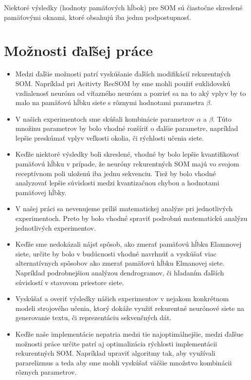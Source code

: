 Niektoré výsledky (hodnoty pamäťových hĺbok) pre SOM sú čiastočne skreslené
pamäťovými oknami, ktoré obsahujú iba jednu podpostupnosť.

\section{Možnosti ďaľšej práce}
\begin{itemize}
    \item Medzi ďaľšie možnosti patrí vyskúšanie ďaľších modifikácií rekurentných SOM. 
    Napríklad pri Acitivty RecSOM by sme mohli použiť euklidovskú vzdialenosť neurónu od víťazného neurónu a pozrieť sa na to aký vplyv by to malo 
    na pamäťovú hĺbku siete s rôznymi hodnotami parametra $\beta$.
    \item V našich experimentoch sme skúšali kombinácie parametrov $\alpha$ a $\beta$. Túto množinu parametrov by bolo vhodné rozšíriť o ďalšie parametre, napríklad
    lepšie preskúmať vplyv veľkosti okolia, či rýchlosti učenia siete.
    \item Keďže niektoré výsledky boli skreslené, vhodné by bolo lepšie kvantifikovať pamäťovú hĺbku v prípade, že neuróny rekurentných SOM majú vo svojom
    receptívnom poli uloženú iba jednu sekvenciu. 
    Tiež by bolo vhodné analyzovať lepšie súvislosti medzi kvantizačnou chybou a hodnotami pamäťovej hĺbky.
    \item V našej práci sa nevenujeme príliš matematickej analýze pri jednotlivých experimentoch.
    Preto by bolo vhodné spraviť podrobnú matematickú analýzu jednotlivých experimentov.
    \item Keďže sme nedokázali nájsť spôsob, ako zmerať pamäťovú hĺbku Elamnovej siete, určite by bolo 
    v budúcnosti vhodné navrhnúť a vyskúšať viac alternatívnych spôsobov ako zmerať pamäťovú hĺbku Elmanovej siete. 
    Napríklad podrobnejšiou analýzou dendrogramov, či hľadaním ďaľších súvislostí v stavovom priestore siete.
    \item Vyskúšať a overiť výsledky nášich experimentov v nejakom konkrétnom modeli strojového učenia, ktorý dokáže 
    využiť rekurentné neurónové siete na generovanie textu, či reprezentáciu sekvenčných dát.
    \item Keďže naše implementácie nepatria medzi tie najoptimálnejšie, medzi ďaľšue možnosti práce
    určite patrí aj optimalizácia rýchlosti implementácii rekurentných SOM. Napríklad upraviť algoritmy tak, aby využívali
    pararelizmus a teda aby sme mohli vyskúšať väčšie množstvo kombinácii rôznych parametrov.
\end{itemize}





